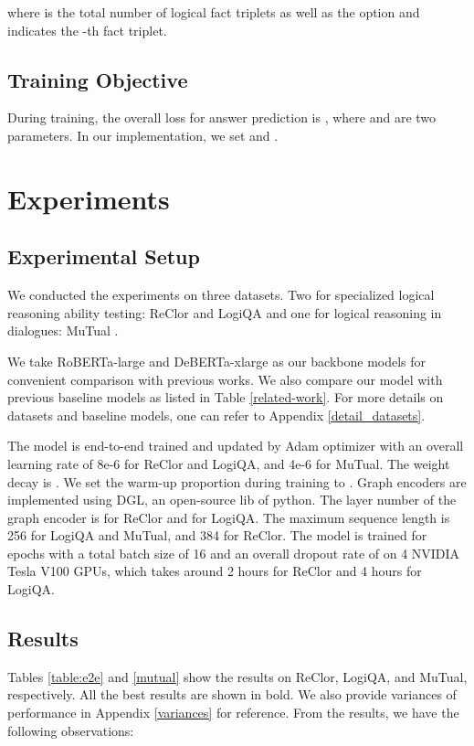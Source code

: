 \documentclass[11pt]{article}
\begin{document}
   
where  is the total number of logical fact triplets as well as the option and  indicates the -th fact triplet.

\subsection{Training Objective}
During training, the overall loss for answer prediction is ,
where  and  are two parameters. In our implementation, we set  and .

\section{Experiments}
\label{others}

\subsection{Experimental Setup}
We conducted the experiments on three datasets. Two for specialized logical reasoning ability testing: ReClor \citep{yu2020reclor} and LogiQA \citep{ijcai2020-0501} and one for logical reasoning in dialogues: MuTual \citep{mutual}.

We take RoBERTa-large \citep{2019arXiv190711692L} and DeBERTa-xlarge \citep{he2020deberta} as our backbone models for convenient comparison with previous works. We also compare our model with previous baseline models as listed in Table \ref{related-work}. For more details on datasets and baseline models, one can refer to Appendix \ref{detail_datasets}.

The model is end-to-end trained and updated by Adam \citep{2014arxiv1412.6980k} optimizer with an overall learning rate of 8e-6 for ReClor and LogiQA, and 4e-6 for MuTual. The weight decay is . We set the warm-up proportion during training to . Graph encoders are implemented using DGL, an open-source lib of python. The layer number of the graph encoder is  for ReClor and  for LogiQA.  The maximum sequence length is 256 for LogiQA and MuTual, and 384 for ReClor. The model is trained for  epochs with a total batch size of 16 and an overall dropout rate of  on 4 NVIDIA Tesla V100 GPUs, which takes around 2 hours for ReClor and 4 hours for LogiQA.




\subsection{Results}    
Tables \ref{table:e2e} and \ref{mutual} show the results on ReClor, LogiQA, and MuTual, respectively. All the best results are shown in bold. We also provide variances of performance in Appendix \ref{variances} for reference. From the results, we have the following observations:
\end{document}
